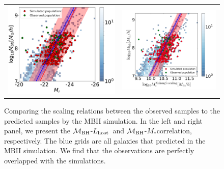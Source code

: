 \documentclass{natureprintstyle}
\newcommand{\mbh}{$\mathcal M_{\rm BH}$}
\newcommand{\lhost}{$L_{\rm host}$}
\newcommand{\mstar}{{$M_*$}}
\begin{document}
\begin{figure}%
\begin{tabular}{c c}
\includegraphics[width=0.5\linewidth]{MBII_ML.pdf} &
\includegraphics[width=0.5\linewidth]{MBII_MM.png} \\
\end{tabular}
\caption{
Comparing the scaling relations between the observed samples to the predicted samples by the MBII simulation. In the left and right panel, we present the \mbh-\lhost\ and \mbh-\mstar correlation, respectively. The blue grids are all galaxies that predicted in the MBII simulation. We find that the observations are perfectly overlapped with the simulations. 
}
\label{fig:MBII_comp}
\end{figure}
\end{document}
